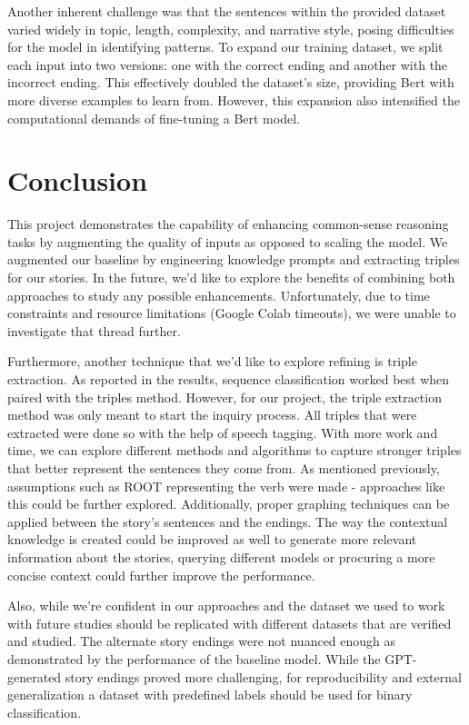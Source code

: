\documentclass{article}
\begin{document}
\begin{multicols}{2}
Another inherent challenge was that the sentences within the provided dataset varied widely in topic, length, complexity, and narrative style, posing difficulties for the model in identifying patterns. To expand our training dataset, we split each input into two versions: one with the correct ending and another with the incorrect ending. This effectively doubled the dataset's size, providing Bert with more diverse examples to learn from. However, this expansion also intensified the computational demands of fine-tuning a Bert model.

\section{Conclusion}

This project demonstrates the capability of enhancing common-sense reasoning tasks by augmenting the quality of inputs as opposed to scaling the model. We augmented our baseline by engineering knowledge prompts and extracting triples for our stories. In the future, we’d like to explore the benefits of combining both approaches to study any possible enhancements. Unfortunately, due to time constraints and resource limitations (Google Colab timeouts), we were unable to investigate that thread further.

Furthermore, another technique that we’d like to explore refining is triple extraction. As reported in the results, sequence classification worked best when paired with the triples method. However, for our project, the triple extraction method was only meant to start the inquiry process. All triples that were extracted were done so with the help of speech tagging. With more work and time, we can explore different methods and algorithms to capture stronger triples that better represent the sentences they come from. As mentioned previously, assumptions such as ROOT representing the verb were made - approaches like this could be further explored. Additionally, proper graphing techniques can be applied between the story’s sentences and the endings. 
The way the contextual knowledge is created could be improved as well to generate more relevant information about the stories, querying different models or procuring a more concise context could further improve the performance.

Also, while we’re confident in our approaches and the dataset we used to work with future studies should be replicated with different datasets that are verified and studied. The alternate story endings were not nuanced enough as demonstrated by the performance of the baseline model. While the GPT-generated story endings proved more challenging, for reproducibility and external generalization a dataset with predefined labels should be used for binary classification.


\end{multicols}
\end{document}
